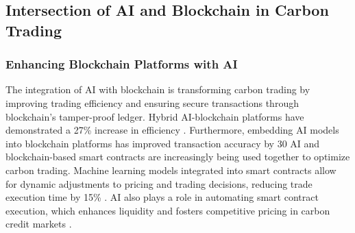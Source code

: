 \documentclass[preprint,12pt]{elsarticle}
\begin{document}
\begin{table}[ht!]
    \centering
    \caption{Cryptocurrencies Supporting Sustainability}
    \label{tab:tab1}
\end{table}
\subsection{Intersection of AI and Blockchain in Carbon Trading}
\subsubsection{Enhancing Blockchain Platforms with AI }
The integration of AI with blockchain is transforming carbon trading by improving trading efficiency and ensuring secure transactions through blockchain's tamper-proof ledger. Hybrid AI-blockchain platforms have demonstrated a 27\% increase in efficiency \citep{wang2022enhancing}. Furthermore, embedding AI models into blockchain platforms has improved transaction accuracy by 30%
AI and blockchain-based smart contracts are increasingly being used together to optimize carbon trading. Machine learning models integrated into smart contracts allow for dynamic adjustments to pricing and trading decisions, reducing trade execution time by 15\% \citep{ecocoina2023}. AI also plays a role in automating smart contract execution, which enhances liquidity and fosters competitive pricing in carbon credit markets \citep{mihaylov2014nrgcoin}.
\end{document}

